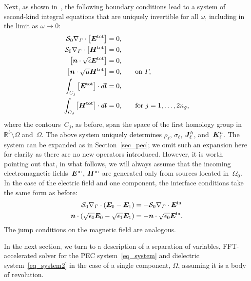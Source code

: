 \documentclass[11pt]{article}
\newcommand{\vct}{\vectorsym}
\newcommand{\surfdiv}{\nabla_\Gamma \cdot}
\newcommand{\bbR}{\mathbb R}
\newcommand{\bn}{\vct{ n}}
\newcommand{\bE}{\vectorsym{E}}
\newcommand{\bJ}{\vct{ J}}
\newcommand{\bK}{\vct{ K}}
\newcommand{\cS}{\mathcal S}
\newcommand\bl{\vct{ l}}
\newcommand\bEtot{\vct{E}^\textnormal{tot}}
\newcommand\bHtot{\vct{H}^\textnormal{tot}}
\newcommand\bEin{\vct{E}^\textnormal{in}}
\newcommand\bHin{\vct{H}^\textnormal{in}}
\numberwithin{equation}{section}
\begin{document}
Next, as shown in~\cite{EpGrOn}, the following boundary conditions
lead to a system of second-kind integral equations that are uniquely
invertible for all $\omega$, including in the limit as $\omega \to 0$:
\begin{equation}\label{eq_system2}
  \begin{aligned}
    \cS_0 \surfdiv \left[ \bEtot \right]  &= 0, & & \\
    \cS_0 \surfdiv \left[ \bHtot \right]  &= 0, & & \\
    \left[ \bn \cdot \sqrt{\epsilon} \bEtot \right]  &= 0, & & \\
    \left[ \bn \cdot \sqrt{\mu} \bHtot \right]  &= 0, &\quad 
          &\text{on } \Gamma, \\
     \int_{C_j} \left[ \bEtot \right] \cdot d\bl &= 0, & & \\
     \int_{C_j} \left[ \bHtot \right] \cdot d\bl &= 0, & 
         &\text{for } j = 1,\ldots,  2n_g,
  \end{aligned}
\end{equation}
where the contours~$C_j$, as before, span the space of the first
homology group in~$\bbR^3 \setminus \Omega$ and~$\Omega$.
The above system uniquely determines $\rho_\ell$, $\sigma_\ell$,
$\bJ_\ell^h$, and~$\bK_\ell^h$.
The system can be expanded as in Section~\ref{sec_pec}; we omit such
an expansion here for clarity as there are no new operators
introduced. However, it is worth pointing out that, in what follows, we
will always assume that the incoming electromagnetic fields~$\bEin$,
$\bHin$ are generated only from sources located
in~$\Omega_0$. In the case of the electric field and one
component, the interface conditions take the same form
as before:
\begin{equation}
  \begin{aligned}
     \cS_0 \surfdiv  \left( \bE_0 - \bE_1 \right) 
      &= -\cS_0 \surfdiv \bEin \\
    \bn \cdot \left( \sqrt{\epsilon_0} \bE_0 
      - \sqrt{\epsilon_1} \bE_1 \right) &= -\bn \cdot \sqrt{\epsilon_0} \bEin.
  \end{aligned}
\end{equation}
The jump conditions on the magnetic field are analogous.

In the next section,
we turn to a description of a separation of variables,
FFT-accelerated solver for the PEC system~\eqref{eq_system}
and dielectric system~\eqref{eq_system2} in the case of a single
component, $\Omega$, assuming it is a body of revolution.
\end{document}
